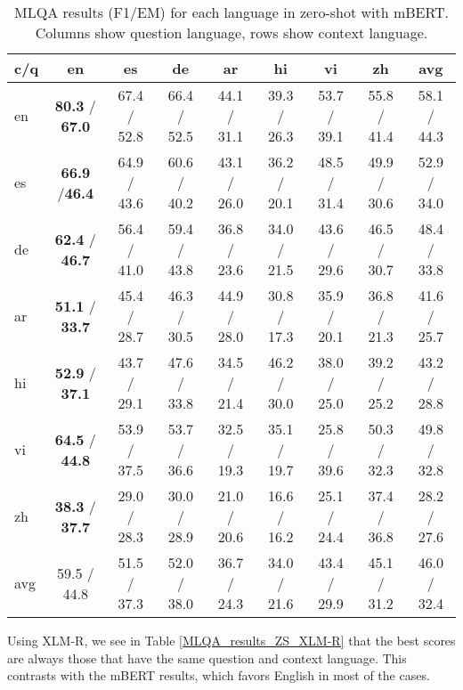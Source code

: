 \documentclass[11pt]{article}
\begin{document}
\begin{table*}[!ht]
    \centering
    \begin{adjustbox}{max width=\textwidth}
    \begin{tabular}{l|ccccccc|c}
    \toprule
        c/q & en & es & de & ar & hi & vi & zh & avg \\ \midrule
        en & \textbf{80.3} / \textbf{67.0} & 67.4 / 52.8 & 66.4 / 52.5 & 44.1 / 31.1 & 39.3 / 26.3 & 53.7 / 39.1 & 55.8 / 41.4 & 58.1 / 44.3 \\
        es & \textbf{66.9} /\textbf{46.4} & 64.9 / 43.6 & 60.6 / 40.2 & 43.1 / 26.0 & 36.2 / 20.1 & 48.5 / 31.4 & 49.9 / 30.6 & 52.9 / 34.0 \\ 
        de & \textbf{62.4} / \textbf{46.7} & 56.4 / 41.0 & 59.4 / 43.8 & 36.8 / 23.6 & 34.0 / 21.5 & 43.6 / 29.6 & 46.5 / 30.7 & 48.4 / 33.8 \\ 
        ar & \textbf{51.1} / \textbf{33.7} & 45.4 / 28.7 & 46.3 / 30.5 & 44.9 / 28.0 & 30.8 / 17.3 & 35.9 / 20.1 & 36.8 / 21.3 & 41.6 / 25.7 \\ 
        hi & \textbf{52.9} / \textbf{37.1} & 43.7 / 29.1 & 47.6 / 33.8 & 34.5 / 21.4 & 46.2 / 30.0 & 38.0 / 25.0 & 39.2 / 25.2 & 43.2 / 28.8 \\ 
        vi & \textbf{64.5} / \textbf{44.8} & 53.9 / 37.5 & 53.7 / 36.6 & 32.5 / 19.3 & 35.1 / 19.7 & 25.8 / 39.6 & 50.3 / 32.3 & 49.8 / 32.8 \\ 
        zh & \textbf{38.3} / \textbf{37.7} & 29.0 / 28.3 & 30.0 / 28.9 & 21.0 / 20.6 & 16.6 / 16.2 & 25.1 / 24.4 & 37.4 / 36.8 & 28.2 / 27.6 \\ \midrule
        avg & 59.5 / 44.8 & 51.5 / 37.3 & 52.0 / 38.0 & 36.7 / 24.3 & 34.0 / 21.6 & 43.4 / 29.9 & 45.1 / 31.2 & 46.0 / 32.4 \\ \bottomrule
    \end{tabular}
    \end{adjustbox}
    \caption{MLQA results (F1/EM) for each language in zero-shot with mBERT. Columns show question language, rows show context language.}
    \label{MLQA_results_ZS_mBERT}
\end{table*}

Using XLM-R, we see in Table \ref{MLQA_results_ZS_XLM-R} that the best scores are always those that have the same question and context language. This contrasts with the mBERT results, which favors English in most of the cases.
\end{document}
